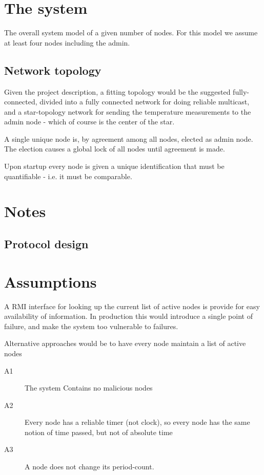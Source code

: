 \documentclass[10pt,a4paper]{article}
\begin{document}
\section{The system}

The overall system model of a given number of nodes. For this model we assume at least four nodes including the admin.
\subsection{Network topology}
Given the project description, a fitting topology would be the suggested fully-connected, divided into a fully connected network for doing reliable multicast, and a star-topology network for sending the temperature measurements to the admin node - which of course is the center of the star.

\label{network_topology}
A single unique node is, by agreement among all nodes, elected as admin node. The election causes a global lock of all nodes until agreement is made.

Upon startup every node is given a unique identification that must be quantifiable - i.e. it must be comparable.


\section{Notes}
\subsection{Protocol design}

\section{Assumptions}
A RMI interface for looking up the current list of active nodes is provide for easy availability of information. In production this would introduce a single point of failure, and make the system too vulnerable to failures.


Alternative approaches would be to have every node maintain a list of active nodes

\begin{description}
 \item[A1] The system Contains no malicious nodes
 \item[A2] Every node has a reliable timer (not clock), so every node has the same notion of time passed, but not of absolute time
 \item[A3] A node does not change its period-count.
\end{description} 
\end{document}
